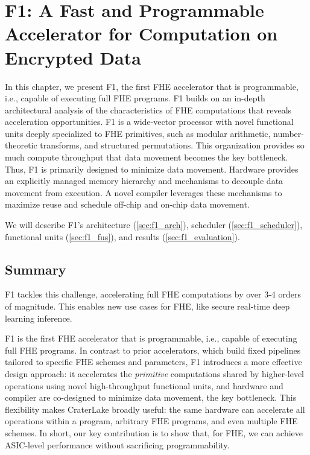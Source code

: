 \documentclass[12pt,twoside]{mitthesis}
\renewcommand{\name}{CraterLake\xspace}
\begin{document}


\pagestyle{plain}





\chapter{F1: A Fast and Programmable Accelerator for Computation on Encrypted Data}

In this chapter, we present F1, the first FHE accelerator that is
programm\-able, i.e., capable of executing full FHE programs. F1 builds on an
in-depth architectural analysis of the characteristics of FHE computations that
reveals acceleration opportunities. F1 is a wide-vector processor with novel
functional units deeply specialized to FHE primitives, such as modular
arithmetic, number-theoretic transforms, and structured permutations. This
organization provides so much compute throughput that data movement becomes the
key bottleneck. Thus, F1 is primarily designed to minimize data movement.
Hardware provides an explicitly managed memory hierarchy and mechanisms to
decouple data movement from execution. A novel compiler leverages these
mechanisms to maximize reuse and schedule off-chip and on-chip data movement.

We will describe F1's architecture (\autoref{sec:f1_arch}), scheduler
(\autoref{sec:f1_scheduler}), functional units (\autoref{sec:f1_fus}), and
results (\autoref{sec:f1_evaluation}).





\let\cleardoublepage\clearpage %

\section{Summary}

F1 tackles this challenge, accelerating full FHE computations by over 3-4
orders of magnitude. This enables new use cases for FHE, like secure real-time
deep learning inference.

F1 is the first FHE accelerator that is programmable, i.e., capable of
executing full FHE programs. In contrast to prior accelerators, which build
fixed pipelines tailored to specific FHE schemes and parameters, F1 introduces
a more effective design approach: it accelerates the \emph{primitive}
computations shared by higher-level operations using novel high\hyp{}throughput
functional units, and hardware and compiler are co-designed to minimize data
movement, the key bottleneck. This flexibility makes \name broadly useful: the
same hardware can accelerate all operations within a program, arbitrary FHE
programs, and even multiple FHE schemes. In short, our key contribution is to
show that, for FHE, we can achieve ASIC-level performance without sacrificing
programmability.
\end{document}
